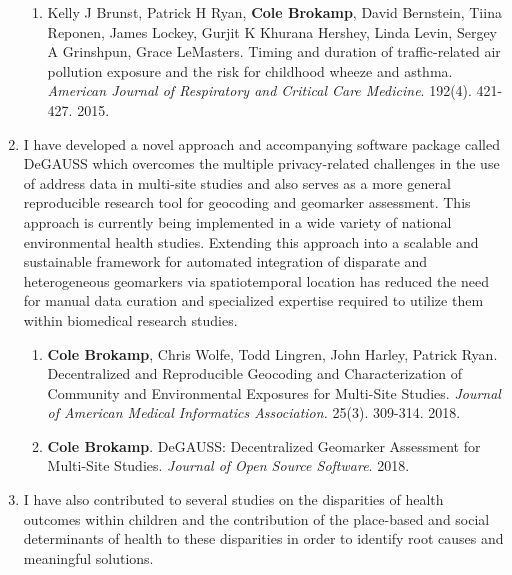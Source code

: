 \documentclass{nihbiosketch}
\begin{document}
\begin{enumerate}
\begin{enumerate}
  \item Kelly J Brunst, Patrick H Ryan, \textbf{Cole Brokamp}, David Bernstein,
    Tiina Reponen, James Lockey, Gurjit K Khurana Hershey, Linda Levin,
    Sergey A Grinshpun, Grace LeMasters. Timing and duration of
    traffic-related air pollution exposure and the risk for childhood wheeze
    and asthma. \emph{American Journal of Respiratory and Critical Care
      Medicine}. 192(4). 421-427. 2015.

  \end{enumerate}

\item I have developed a novel approach and accompanying software package called DeGAUSS
  which overcomes the multiple privacy-related challenges in the use of address data in
  multi-site studies and also serves as a more general reproducible research
  tool for geocoding and geomarker assessment. This approach is currently being
  implemented in a wide variety of national environmental health studies. Extending this
  approach into a scalable and sustainable framework for automated integration of
  disparate and heterogeneous geomarkers via spatiotemporal location has reduced
  the need for manual data curation and specialized expertise required
  to utilize them within biomedical research studies.

\begin{enumerate}
	
	\item \textbf{Cole Brokamp}, Chris Wolfe, Todd Lingren, John Harley, Patrick Ryan. Decentralized and Reproducible Geocoding and Characterization of Community and Environmental Exposures for Multi-Site Studies. \textit{Journal of American Medical Informatics Association.} 25(3). 309-314. 2018.
	
	\item \textbf{Cole Brokamp}. DeGAUSS: Decentralized Geomarker Assessment for Multi-Site Studies. \textit{Journal of Open Source Software}. 2018. 

\end{enumerate}

\item I have also contributed to several studies on the disparities of health outcomes within children and the contribution of the place-based and social determinants of health to these disparities in order to identify root causes and meaningful solutions.

\begin{enumerate}


\end{enumerate}
\end{enumerate}
\end{document}
